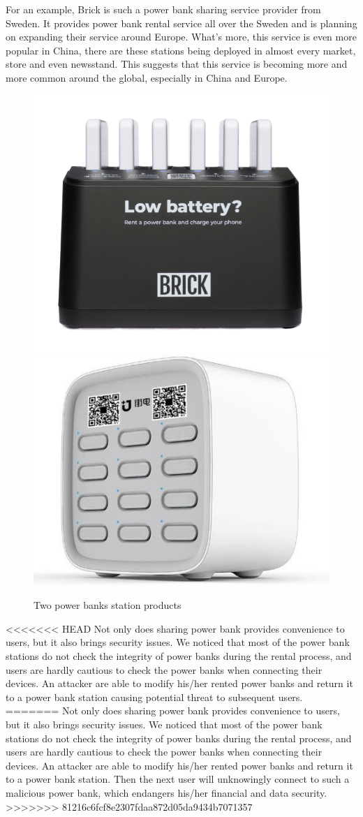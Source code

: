 For an example, Brick is such a power bank sharing service provider from Sweden. It provides power bank rental service all over the Sweden and is planning on expanding their service around Europe. What's more, this service is even more popular in China, there are these stations being deployed in almost every market, store and even newsstand. This suggests that this service is becoming more and more common around the global, especially in China and Europe.

\begin{figure}[t]
	\centering
	\includegraphics[width=.4 \linewidth]{./Figs/Brick_station.png}
	\includegraphics[width=.4 \linewidth]{./Figs/jiedian.jpg}
	\caption{Two power banks station products}
	\label{fig:PBS_products}
\end{figure}



<<<<<<< HEAD
Not only does sharing power bank provides convenience to users, but it also brings security issues. 
We noticed that most of the power bank stations do not check the integrity of power banks during the rental process, and users are hardly cautious to check the power banks when connecting their devices. 
An attacker are able to modify his/her rented power banks and return it to a power bank station causing potential threat to subsequent users.
=======
Not only does sharing power bank provides convenience to users, but it also brings security issues.
We noticed that most of the power bank stations do not check the integrity of power banks during the rental process, and users are hardly cautious to check the power banks when connecting their devices.
An attacker are able to modify his/her rented power banks and return it to a power bank station.
Then the next user will unknowingly connect to such a malicious power bank, which endangers his/her financial and data security.
>>>>>>> 81216c6fcf8e2307fdaa872d05da9434b7071357


